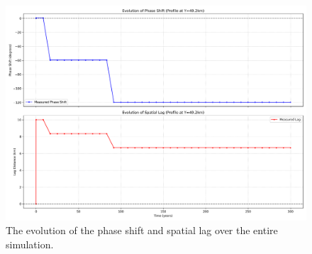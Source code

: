 \begin{figure}[H]
    \includegraphics[scale=0.39]{S1_phase_evolution_summary.png}
    \caption{The evolution of the phase shift and spatial lag over the entire simulation.}
    \label{fig:phase_analysis_Evolution_Plots}
\end{figure}








